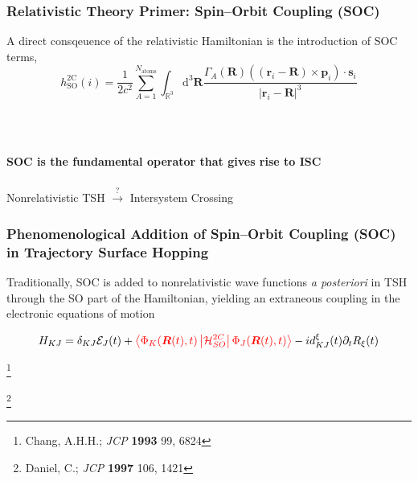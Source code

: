 \documentclass[usepdftitle=false,10pt]{beamer}
\newcommand{\innerop}[3]{\left\langle #1 \left\vert #2 \right\vert #3 \right\rangle}  %
\newcommand*\vc[1]{\boldsymbol{#1}}
\newcommand\blfootnote[1]{%
  \begingroup
  \renewcommand\thefootnote{}\footnote{#1}%
  \addtocounter{footnote}{-1}%
  \endgroup
}
\begin{document}
\begin{frame}
  \frametitle{Relativistic Theory Primer: Spin--Orbit Coupling (SOC)}

  A direct consqeuence of the relativistic Hamiltonian is the introduction of SOC terms,
  \begin{equation*}
    h^\mathrm{2C}_\mathrm{SO} (i) = \frac{1}{2c^2} \sum_{A=1}^{N_\mathrm{atoms}}
      \int_{\mathbb{R}^3}\mathrm{d}^3\vc{R}
      \frac{\Gamma_A(\vc{R})
        (( \vc{r}_i - \vc{R} ) \times \vc{p}_i)\cdot \vc{s}_i}
	{\vert \vc{r}_i - \vc{R} \vert^3}
  \end{equation*}

  ~\\
  ~\\
  \begin{center}
  {\LARGE \bf SOC is the fundamental operator that gives rise to ISC}
  \end{center}
\end{frame}

\begin{frame}
\frametitle{}
\begin{center}
{\LARGE
  Nonrelativistic TSH $\xrightarrow{?}$ Intersystem Crossing
}
\end{center}
\end{frame}


\begin{frame}
  \frametitle{Phenomenological Addition of Spin--Orbit Coupling (SOC) in
  Trajectory Surface Hopping}

  Traditionally, SOC is added to nonrelativistic wave functions 
  \emph{a posteriori} in TSH through the SO part of the 
  Hamiltonian, yielding an extraneous coupling in the electronic equations of motion

%

  \begin{equation*}
    H_{KJ} = \delta_{KJ}\mathcal{E}_J(t) +
    {\color{red}
      \innerop{\Phi_K(\vc{R}(t),t)}{\mathcal{H}_{SO}^{2C}}{\Phi_J(\vc{R}(t),t)}
    }
    - i d_{KJ}^\xi (t) \partial_t R_{\xi}(t) 
  \end{equation*}

  \vfill
  \blfootnote{\tiny Chang, A.H.H.; \emph{JCP} \textbf{1993} 99, 6824}
  \blfootnote{\tiny Daniel, C.; \emph{JCP} \textbf{1997} 106, 1421}
\end{frame}
\end{document}
